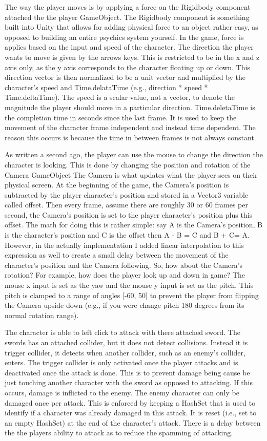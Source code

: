 \documentclass[conference]{IEEEtran}
\begin{document}
The way the player moves is by applying a force on the Rigidbody component attached the the player GameObject.
The Rigidbody component is something built into Unity that allows for adding physical force to an object rather easy, as opposed to building an entire psychics system yourself.
In the game, force is applies based on the input and speed of the character.
The direction the player wants to move is given by the arrows keys.
This is restricted to be in the x and z axis only, as the y axis corresponds to the character floating up or down.
This direction vector is then normalized to be a unit vector and multiplied by the character’s speed and Time.delataTime (e.g., direction * speed * Time.deltaTime).
The speed is a scalar value, not a vector, to denote the magnitude the player should move in a particular direction.
Time.deletaTime is the completion time in seconds since the last frame.\cite{b2}
It is used to keep the movement of the character frame independent and instead time dependent.
The reason this occurs is because the time in between frames is not always constant.

As written a second ago, the player can use the mouse to change the direction the character is looking.
This is done by changing the position and rotation of the Camera GameObject
The Camera is what  updates what the player sees on their physical screen.
At the beginning of the game, the Camera’s position is subtracted by the player character’s position and stored in a Vector3 variable called offset.
Then every frame, assume there are roughly 30 or 60 frames per second, the Camera’s position is set to the player character’s position plus this offset.
The math for doing this is rather simple: say A is the Camera’s position, B is the character’s position and C is the offset then A - B = C and B + C= A.
However, in the actually implementation I added linear interpolation to this expression as well to create a small delay between the movement of the character’s position and the Camera following.
So, how about the Camera’s rotation?
For example, how does the player look up and down in game?
The mouse x input is set as the yaw and the mouse y input is set as the pitch.
This pitch is clamped to a range of angles [-60, 50] to prevent the player from flipping the Camera upside down (e.g., if you were change pitch 180 degrees from its normal rotation range).

The character is able to left click to attack with there attached sword.
The swords has an attached collider, but it does not detect collisions.
Instead it is trigger collider, it detects when another collider, such as an enemy’s collider, enters.
The trigger collider is only activated once the player attacks and is deactivated once the attack is done.
This is to prevent damage being cause be just touching another character with the sword as opposed to attacking.
If this occurs, damage is inflicted to the enemy.
The enemy character can only be damaged once per attack.
This is enforced by keeping a HashSet that is used to identify if a character was already damaged in this attack.
It is reset (i.e., set to an empty HashSet) at the end of the character’s attack.
There is a delay between the the players ability to attack as to reduce the spamming of attacking.
\end{document}
